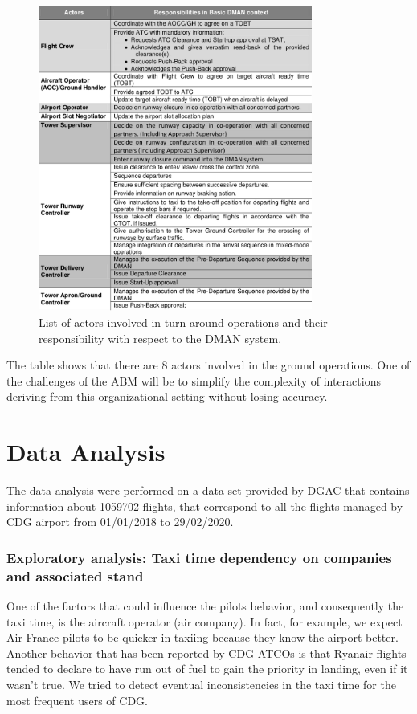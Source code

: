 \documentclass{article}
\begin{document}
\begin{figure}[h!!!!!!!!!!!!!!!!]

	\centering
	\includegraphics[width=9cm]{tabella.png}
	\caption{List of actors involved in turn around operations and their responsibility with respect to the DMAN system.}
	\label{actors}

\end{figure}

\bigskip
The table shows that there are 8 actors involved in the ground operations. One of the challenges of the ABM will be to simplify the complexity of interactions deriving from this organizational setting without losing accuracy.

\newpage
\part{Data Analysis}

The data analysis were performed on a data set provided by DGAC that contains information about 1059702 flights, that correspond to all the flights managed by CDG airport from 01/01/2018 to 29/02/2020.


\section{Exploratory analysis: Taxi time dependency on companies and associated stand}\label{exploratory}

One of the factors that could influence the pilots behavior, and consequently the taxi time, is the aircraft operator (air company). In fact, for example, we expect Air France pilots to be quicker in taxiing because they know the airport better. Another behavior that has been reported by CDG ATCOs is that Ryanair flights tended to declare to have run out of fuel to gain the priority in landing, even if it wasn't true. We tried to detect eventual inconsistencies in the taxi time for the most frequent users of CDG.
\end{document}
